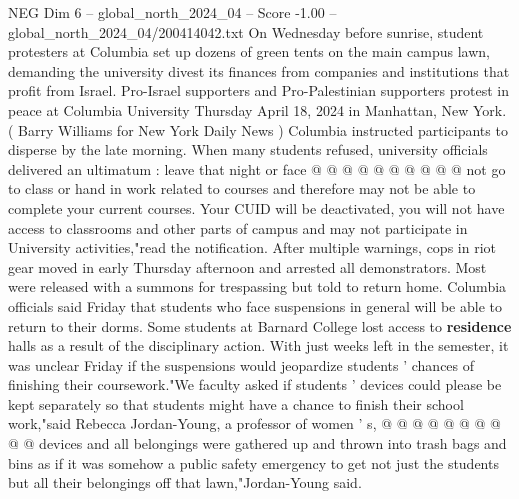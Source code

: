 \begin{textsample}{NEG Dim 6 – global\_north\_2024\_04 – Score -1.00 – global\_north\_2024\_04/200414042.txt}
On Wednesday before sunrise, student protesters at Columbia set up dozens of green tents on the main campus lawn, demanding the university divest its finances from companies and institutions that profit from Israel.
Pro-Israel supporters and Pro-Palestinian supporters protest in peace at Columbia University Thursday April 18, 2024 in Manhattan, New York. ( Barry Williams for New York Daily News ) Columbia instructed participants to disperse by the late morning.
When many students refused, university officials delivered an ultimatum : leave that night or face @ @ @ @ @ @ @ @ @ @ not go to class or hand in work related to courses and therefore may not be able to complete your current courses.
Your CUID will be deactivated, you will not have access to classrooms and other parts of campus and may not participate in University activities,"read the notification.
After multiple warnings, cops in riot gear moved in early Thursday afternoon and arrested all demonstrators.
Most were released with a summons for trespassing but told to return home.
Columbia officials said Friday that students who face suspensions in general will be able to return to their dorms.
Some students at Barnard College lost access to \textbf{residence} halls as a result of the disciplinary action.
With just weeks left in the semester, it was unclear Friday if the suspensions would jeopardize students ' chances of finishing their coursework."We faculty asked if students ' devices could please be kept separately so that students might have a chance to finish their school work,"said Rebecca Jordan-Young, a professor of women ' s, @ @ @ @ @ @ @ @ @ @ devices and all belongings were gathered up and thrown into trash bags and bins as if it was somehow a public safety emergency to get not just the students but all their belongings off that lawn,"Jordan-Young said.

\end{textsample}
